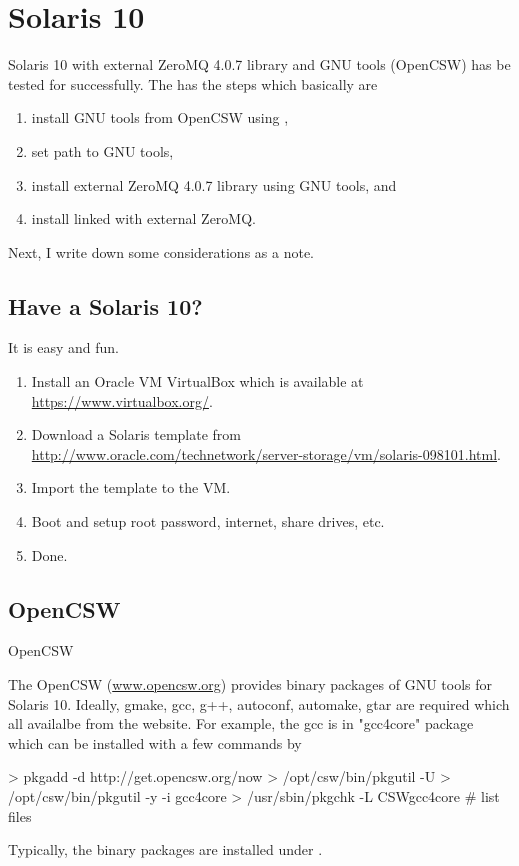\section[Solaris 10]{Solaris 10}
\label{sec:solaris_10}

Solaris 10 with external ZeroMQ 4.0.7 library and GNU tools (OpenCSW)
has be tested for  successfully. The 
has the steps which basically are
\begin{enumerate}
\item install GNU tools from OpenCSW using ,
\item set path to GNU tools,
\item install external ZeroMQ 4.0.7 library using GNU tools, and
\item install  linked with external ZeroMQ.
\end{enumerate}
Next, I write down some considerations as a note.


\subsection[Have a Solaris 10?]{Have a Solaris 10?}
\label{sec:have_solaris_10}
It is easy and fun.
\begin{enumerate}
\item
Install an Oracle VM VirtualBox which is available at
\url{https://www.virtualbox.org/}.
\item
Download a Solaris template from \\
\url{http://www.oracle.com/technetwork/server-storage/vm/solaris-098101.html}.
\item
Import the template to the VM.
\item
Boot and setup root password, internet, share drives, etc.
\item
Done.
\end{enumerate}


\subsection{OpenCSW}{OpenCSW}
\label{sec:opencsw}
The OpenCSW (\url{www.opencsw.org}) provides binary packages of GNU tools
for Solaris 10. Ideally, gmake, gcc, g++, autoconf, automake, gtar are
required which all availalbe from the website. For example, the gcc is in
"gcc4core" package which can be installed with a few 
commands by
\begin{Code}
> pkgadd -d http://get.opencsw.org/now
> /opt/csw/bin/pkgutil -U
> /opt/csw/bin/pkgutil -y -i gcc4core 
> /usr/sbin/pkgchk -L CSWgcc4core # list files
\end{Code}
Typically, the binary packages are installed under
.

